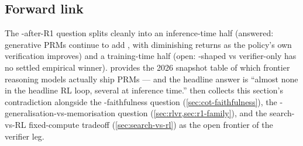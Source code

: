 \subsection{Forward link}
\label{sec:prm-survival-forward}

The -after-R1 question splits cleanly into an inference-time half
(answered: generative PRMs continue to add , with diminishing
returns as the policy's own verification improves) and a training-time
half (open: -shaped  vs verifier-only  has no settled
empirical winner).  provides the
2026 snapshot table of which frontier reasoning models actually ship
PRMs --- and the headline answer is ``almost none in the headline RL
loop, several at inference time.''  then
collects this section's contradiction alongside the -faithfulness
question (\cref{sec:cot-faithfulness}), the
-generalisation-vs-memorisation question
(\cref{sec:rlvr,sec:r1-family}), and the search-vs-RL fixed-compute
tradeoff (\cref{sec:search-vs-rl}) as the open frontier of the
verifier leg.
